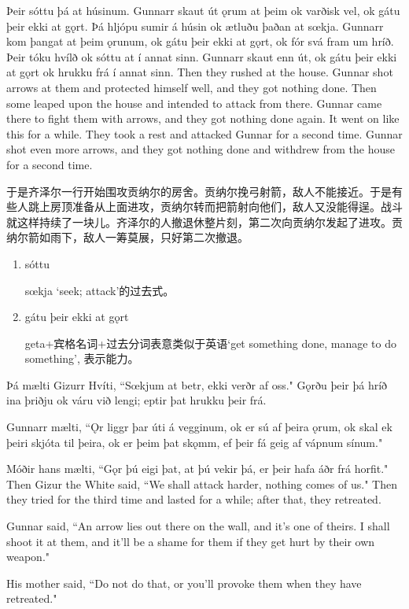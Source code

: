 \begin{paracol}{2}
    Þeir sóttu þá at húsinum. Gunnarr skaut út ǫrum at þeim ok varðisk vel, ok gátu þeir ekki at gǫrt. Þá hljópu sumir á húsin ok ætluðu þaðan at sœkja. Gunnarr kom þangat at þeim ǫrunum, ok gátu þeir ekki at gǫrt, ok fór svá fram um hríð. Þeir tóku hvílð ok sóttu at í annat sinn. Gunnarr skaut enn út, ok gátu þeir ekki at gǫrt ok hrukku frá í annat sinn.
    \switchcolumn
    Then they rushed at the house. Gunnar shot arrows at them and protected himself well, and they got nothing done. Then some leaped upon the house and intended to attack from there. Gunnar came there to fight them with arrows, and they got nothing done again. It went on like this for a while. They took a rest and attacked Gunnar for a second time. Gunnar shot even more arrows, and they got nothing done and withdrew from the house for a second time.
\end{paracol}
\begin{translation*}{}
    于是齐泽尔一行开始围攻贡纳尔的房舍。贡纳尔挽弓射箭，敌人不能接近。于是有些人跳上房顶准备从上面进攻，贡纳尔转而把箭射向他们，敌人又没能得逞。战斗就这样持续了一块儿。齐泽尔的人撤退休整片刻，第二次向贡纳尔发起了进攻。贡纳尔箭如雨下，敌人一筹莫展，只好第二次撤退。
\end{translation*}
\begin{grammar*}{}
    \begin{enumerate}[leftmargin=*]
        \item sóttu

              sœkja `seek; attack'的过去式。

        \item gátu þeir ekki at gǫrt

              geta+宾格名词+过去分词表意类似于英语`get something done, manage to do something', 表示能力。
    \end{enumerate}
\end{grammar*}
\begin{paracol}{2}
    Þá mælti Gizurr Hvíti, ``Sœkjum at betr, ekki verðr af oss." Gǫrðu þeir þá hríð ina þriðju ok váru við lengi; eptir þat hrukku þeir frá.

    Gunnarr mælti, ``Ǫr liggr þar úti á vegginum, ok er sú af þeira ǫrum, ok skal ek þeiri skjóta til þeira, ok er þeim þat skǫmm, ef þeir fá geig af vápnum sínum."

    Móðir hans mælti, ``Gǫr þú eigi þat, at þú vekir þá, er þeir hafa áðr frá horfit."
    \switchcolumn
    Then Gizur the White said, ``We shall attack harder, nothing comes of us." Then they tried for the third time and lasted for a while; after that, they retreated.

    Gunnar said, ``An arrow lies out there on the wall, and it's one of theirs. I shall shoot it at them, and it'll be a shame for them if they get hurt by their own weapon."

    His mother said, ``Do not do that, or you'll provoke them when they have retreated."
\end{paracol}
